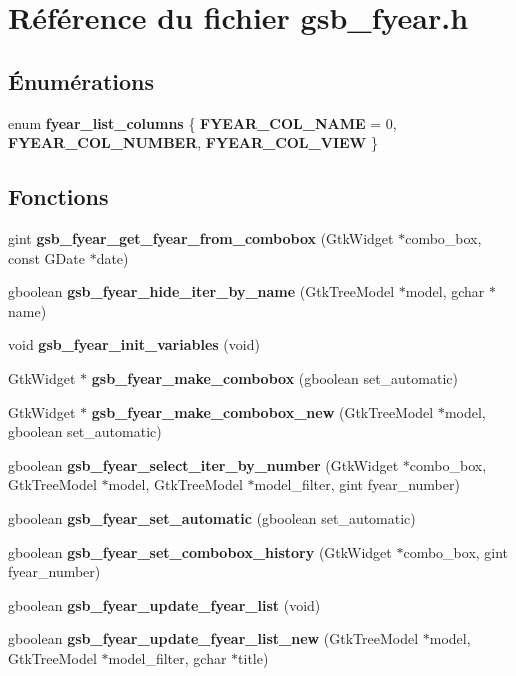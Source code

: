 \section{Référence du fichier gsb\_\-fyear.h}
\label{gsb__fyear_8h}
\subsection*{Énumérations}
\begin{DoxyCompactItemize}
\item 
enum {\bf fyear\_\-list\_\-columns} \{ {\bf FYEAR\_\-COL\_\-NAME} =  0, 
{\bf FYEAR\_\-COL\_\-NUMBER}, 
{\bf FYEAR\_\-COL\_\-VIEW}
 \}
\end{DoxyCompactItemize}
\subsection*{Fonctions}
\begin{DoxyCompactItemize}
\item 
gint {\bf gsb\_\-fyear\_\-get\_\-fyear\_\-from\_\-combobox} (GtkWidget $\ast$combo\_\-box, const GDate $\ast$date)
\item 
gboolean {\bf gsb\_\-fyear\_\-hide\_\-iter\_\-by\_\-name} (GtkTreeModel $\ast$model, gchar $\ast$name)
\item 
void {\bf gsb\_\-fyear\_\-init\_\-variables} (void)
\item 
GtkWidget $\ast$ {\bf gsb\_\-fyear\_\-make\_\-combobox} (gboolean set\_\-automatic)
\item 
GtkWidget $\ast$ {\bf gsb\_\-fyear\_\-make\_\-combobox\_\-new} (GtkTreeModel $\ast$model, gboolean set\_\-automatic)
\item 
gboolean {\bf gsb\_\-fyear\_\-select\_\-iter\_\-by\_\-number} (GtkWidget $\ast$combo\_\-box, GtkTreeModel $\ast$model, GtkTreeModel $\ast$model\_\-filter, gint fyear\_\-number)
\item 
gboolean {\bf gsb\_\-fyear\_\-set\_\-automatic} (gboolean set\_\-automatic)
\item 
gboolean {\bf gsb\_\-fyear\_\-set\_\-combobox\_\-history} (GtkWidget $\ast$combo\_\-box, gint fyear\_\-number)
\item 
gboolean {\bf gsb\_\-fyear\_\-update\_\-fyear\_\-list} (void)
\item 
gboolean {\bf gsb\_\-fyear\_\-update\_\-fyear\_\-list\_\-new} (GtkTreeModel $\ast$model, GtkTreeModel $\ast$model\_\-filter, gchar $\ast$title)
\end{DoxyCompactItemize}


